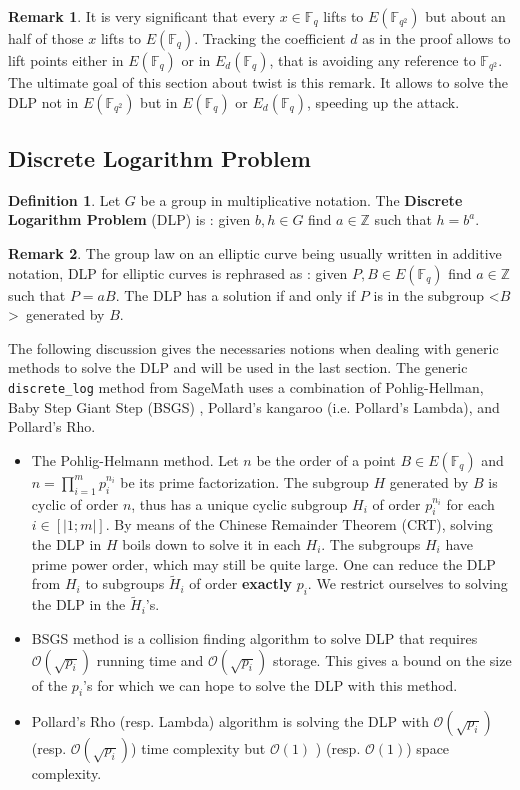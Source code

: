 \documentclass[10pt]{article}
\theoremstyle{definition}
\newtheorem{definition}{Definition}
\newtheorem{remark}{Remark}
\newcommand{\F}{\mathbb{F}}
\newcommand{\Z}{\mathbb{Z}}
\begin{document}
\begin{remark}
It is very significant that every $x \in \F_q$ lifts to $E(\F_{q^2})$ but about an half of those $x$ lifts to $E(\F_q)$.
Tracking the coefficient $d$ as in the proof allows to lift points either in $E(\F_q)$ or in $E_d(\F_q)$, that is avoiding any reference to $\F_{q^2}$.
The ultimate goal of this section about twist is this remark.
It allows to solve the DLP not in $E(\F_{q^2})$ but in $E(\F_q)$ or $E_d(\F_q)$, speeding up the attack.
\end{remark}

\subsection{Discrete Logarithm Problem}

\begin{definition}
Let $G$ be a group in multiplicative notation.
The \textbf{Discrete Logarithm Problem} (DLP) is : given $b,h \in G$ find $a \in \Z$ such that $h = b^a$.
\end{definition}

\noindent \begin{remark}
The group law on an elliptic curve being usually written in additive notation, DLP for elliptic curves is rephrased as : given $P,B \in E(\F_q)$ find $a \in \Z$ such that $P = aB$.
The DLP has a solution if and only if $P$ is in the subgroup \textless$B$\textgreater~generated by $B$.
\end{remark}

The following discussion gives the necessaries notions when dealing with generic methods to solve the DLP and will be used in the last section.
The generic \verb|discrete_log| method from SageMath uses a combination of Pohlig-Hellman, Baby Step Giant Step (BSGS) , Pollard’s kangaroo (i.e. Pollard's Lambda), and Pollard’s Rho. 

\begin{itemize}
\item The Pohlig-Helmann method.
Let $n$ be the order of a point $B \in E(\F_q)$ and  $n = \prod_{i = 1}^m p_i^{n_i}$ be its prime factorization.
The subgroup $H$ generated by $B$ is cyclic of order $n$, thus has a unique cyclic subgroup $H_i$ of order $p_i^{n_i}$ for each $i \in [| 1; m|]$.
By means of the Chinese Remainder Theorem (CRT), solving the DLP in $H$ boils down to solve it in each $H_i$. 
The subgroups $H_i$ have prime power order, which may still be quite large. 
One can reduce the DLP from $H_i$ to subgroups $\tilde{H}_i$ of order \textbf{exactly} $p_i$.
We restrict ourselves to solving the DLP in the $\tilde{H}_i$'s.
\item BSGS method is a collision finding algorithm to solve DLP that requires $\mathcal{O}(\sqrt{p_i})$ running time and $\mathcal{O}(\sqrt{p_i})$ storage.
This gives a bound on the size of the $p_i$'s for which we can hope to solve the DLP with this method.
\item Pollard's Rho (resp. Lambda) algorithm is solving the DLP with $\mathcal{O}(\sqrt{p_i})$ (resp. $\mathcal{O}(\sqrt{p_i})$) time complexity but $\mathcal{O}(1)$ ) (resp. $\mathcal{O}(1)$) space complexity.
\end{itemize}
\end{document}
